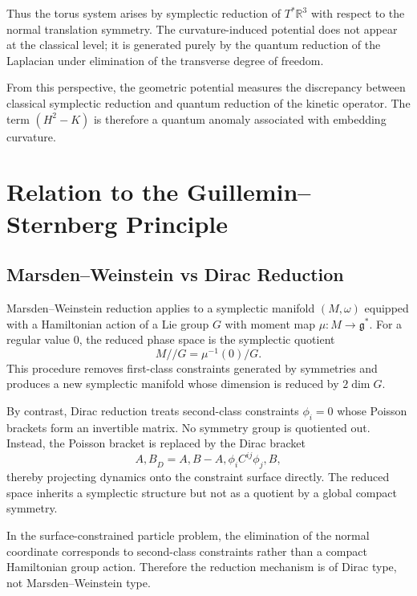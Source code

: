 \documentclass[11pt]{article}
\begin{document}
Thus the torus system arises by symplectic reduction of $T^*\mathbb{R}^3$ with respect to the normal translation symmetry. The curvature-induced potential does not appear at the classical level; it is generated purely by the quantum reduction of the Laplacian under elimination of the transverse degree of freedom.

From this perspective, the geometric potential measures the discrepancy between classical symplectic reduction and quantum reduction of the kinetic operator. The term $(H^2-K)$ is therefore a quantum anomaly associated with embedding curvature.

\section{Relation to the Guillemin--Sternberg Principle}

\subsection*{Marsden--Weinstein vs Dirac Reduction}

Marsden--Weinstein reduction applies to a symplectic manifold $(M,\omega)$ equipped with a Hamiltonian action of a Lie group $G$ with moment map $\mu: M \to \mathfrak{g}^*$. For a regular value $0$, the reduced phase space is the symplectic quotient
\begin{equation}
M//G = \mu^{-1}(0)/G.
\end{equation}
This procedure removes first-class constraints generated by symmetries and produces a new symplectic manifold whose dimension is reduced by $2\dim G$.

By contrast, Dirac reduction treats second-class constraints $\phi_i=0$ whose Poisson brackets form an invertible matrix. No symmetry group is quotiented out. Instead, the Poisson bracket is replaced by the Dirac bracket
\begin{equation}
{A,B}_D = {A,B} - {A,\phi_i}C^{ij}{\phi_j,B},
\end{equation}
thereby projecting dynamics onto the constraint surface directly. The reduced space inherits a symplectic structure but not as a quotient by a global compact symmetry.

In the surface-constrained particle problem, the elimination of the normal coordinate corresponds to second-class constraints rather than a compact Hamiltonian group action. Therefore the reduction mechanism is of Dirac type, not Marsden--Weinstein type.
\end{document}
